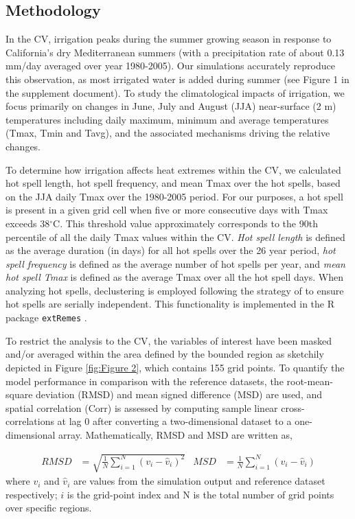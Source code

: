 \documentclass[draft,ms]{agutex}   %
\begin{document}
\begin{article}
\section{Methodology}

In the CV, irrigation peaks during the summer growing season \citep{salas2006estimating} in response to California's dry Mediterranean summers (with a precipitation rate of about 0.13 mm/day averaged over year 1980-2005). Our simulations accurately reproduce this observation, as most irrigated water is added during summer (see Figure 1 in the supplement document). To study the  climatological impacts of irrigation, we focus primarily on changes in June, July and August (JJA) near-surface (2 m) temperatures including daily maximum, minimum and average temperatures (Tmax, Tmin and Tavg), and the associated mechanisms driving the relative changes. 

To determine how irrigation affects heat extremes within the CV, we calculated hot spell length, hot spell frequency, and mean Tmax over the hot spells, based on the JJA daily Tmax over the 1980-2005 period. For our purposes, a hot spell is present in a given grid cell when five or more consecutive days with Tmax exceeds 38$^\circ$C. This threshold value approximately corresponds to the 90th percentile of all the daily Tmax values within the CV. \textit{Hot spell length} is defined as the average duration (in days) for all  hot spells over the 26 year period, \textit{hot spell frequency} is defined as the average number of hot spells per year, and \textit{mean hot spell Tmax} is defined as the average Tmax over all the hot spell days. When analyzing hot spells, declustering is employed following the strategy of \cite{ferro2003inference} to ensure hot spells are serially independent.  This functionality is implemented in the R package \texttt{extRemes} \citep{gilleland2011new}.

To restrict the analysis to the CV, the variables of interest have been masked and/or averaged within the area defined by the bounded region as sketchily depicted in Figure \ref{fig:Figure 2}, which contains 155 grid points. To quantify the model performance in comparison with the reference datasets, the root-mean-square deviation (RMSD) and mean signed difference (MSD) are used, and spatial correlation (Corr) is assessed by computing sample linear cross-correlations at lag 0 after converting a two-dimensional dataset to a one-dimensional array. Mathematically, RMSD and MSD are written as, 

\begin{align}
RMSD &= \sqrt{\frac{1}{N} \sum_{i=1}^{N} (v_i - \hat{v}_i)^2}  & MSD &= \frac{1}{N} \sum_{i=1}^{N} (v_i - \hat{v}_i) 
\end{align} where $v_i$ and $\hat{v}_i$ are values from the simulation output and reference dataset respectively; $i$ is the grid-point index and N is the total number of grid points over specific regions.


\end{article}
\end{document}
